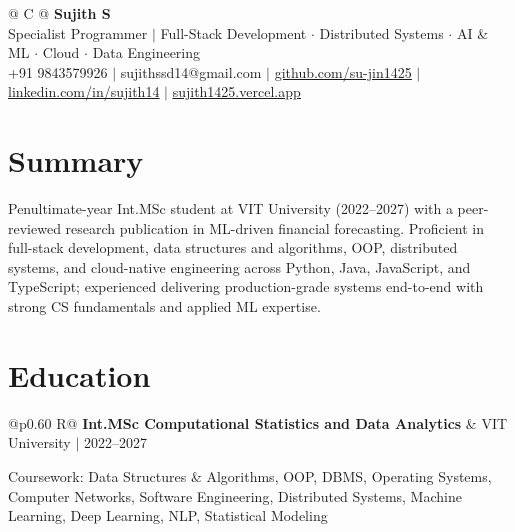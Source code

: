 \documentclass[a4paper,10pt]{article}
\newcommand{\ulink}[2]{\href{#1}{\uline{#2}}}
\newcommand{\subheading}[1]{{\color[HTML]{0A0A0A}\fontsize{12}{14}\selectfont\bfseries #1}}
\newcommand{\meta}[1]{{\color[HTML]{5C5C5C}\fontsize{10.5}{12.5}\selectfont #1}}
\begin{document}
\pagestyle{empty}

\begin{tabularx}{\linewidth}{@{} C @{}}
{\color[HTML]{000000}\fontsize{30}{35}\selectfont\bfseries Sujith S} \\[5pt]
{\fontsize{10.5}{12.5}\selectfont\color[HTML]{3A3A3A}
Specialist Programmer $|$ Full-Stack Development $\cdot$ Distributed Systems $\cdot$ AI \& ML $\cdot$ Cloud $\cdot$ Data Engineering} \\[6pt]
{\fontsize{10.5}{12.5}\selectfont\textcolor[HTML]{3A3A3A}{
+91 9843579926 $|$
sujithssd14@gmail.com $|$
\ulink{https://github.com/su-jin1425}{github.com/su-jin1425} $|$
\ulink{https://linkedin.com/in/sujith14}{linkedin.com/in/sujith14} $|$
\ulink{https://sujith1425.vercel.app}{sujith1425.vercel.app}}}
\end{tabularx}

\vspace{2pt}

\section{Summary}
\vspace{3pt}
{\color[HTML]{0A0A0A}\fontsize{11}{14}\selectfont
Penultimate-year Int.MSc student at VIT University (2022--2027) with a peer-reviewed research publication in ML-driven financial forecasting. Proficient in full-stack development, data structures and algorithms, OOP, distributed systems, and cloud-native engineering across Python, Java, JavaScript, and TypeScript; experienced delivering production-grade systems end-to-end with strong CS fundamentals and applied ML expertise.}

\vspace{2pt}

\section{Education}
\vspace{2pt}

\begin{tabularx}{\linewidth}{@{}p{0.60\linewidth} R@{}}
\subheading{Int.MSc Computational Statistics and Data Analytics} & \meta{VIT University $|$ 2022--2027}
\end{tabularx}
\vspace{1pt}
{\color[HTML]{3A3A3A}\fontsize{11}{14}\selectfont Coursework: Data Structures \& Algorithms, OOP, DBMS, Operating Systems, Computer Networks, Software Engineering, Distributed Systems, Machine Learning, Deep Learning, NLP, Statistical Modeling}
\end{document}
